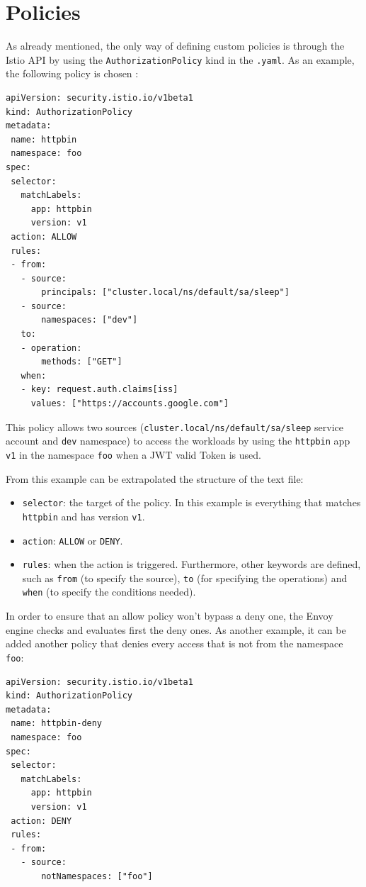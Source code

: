 \section{Policies}
As already mentioned, the only way of defining custom policies is through the Istio API by using the \texttt{AuthorizationPolicy} kind in the \texttt{.yaml}. As an example, the following policy is chosen \cite{authzpolicy}:

\begin{lstlisting}
apiVersion: security.istio.io/v1beta1
kind: AuthorizationPolicy
metadata:
 name: httpbin
 namespace: foo
spec:
 selector:
   matchLabels:
     app: httpbin
     version: v1
 action: ALLOW
 rules:
 - from:
   - source:
       principals: ["cluster.local/ns/default/sa/sleep"]
   - source:
       namespaces: ["dev"]
   to:
   - operation:
       methods: ["GET"]
   when:
   - key: request.auth.claims[iss]
     values: ["https://accounts.google.com"]
\end{lstlisting}

\noindent This policy allows two sources (\texttt{cluster.local/ns/default/sa/sleep} service account and \texttt{dev} namespace) to access the workloads by using the \texttt{httpbin} app \texttt{v1} in the namespace \texttt{foo} when a JWT valid Token is used.

\noindent From this example can be extrapolated the structure of the text file:

\begin{itemize}
 \item \texttt{selector}: the target of the policy. In this example is everything that matches \texttt{httpbin} and has version \texttt{v1}.
 \item \texttt{action}: \texttt{ALLOW} or \texttt{DENY}.
 \item \texttt{rules}: when the action is triggered. Furthermore, other keywords are defined, such as \texttt{from} (to specify the source), \texttt{to} (for specifying the operations) and \texttt{when} (to specify the conditions needed).
\end{itemize}

In order to ensure that an allow policy won't bypass a deny one, the Envoy engine checks and evaluates first the deny ones. As another example, it can be added another policy that denies every access that is not from the namespace \texttt{foo}:

\begin{lstlisting}
apiVersion: security.istio.io/v1beta1
kind: AuthorizationPolicy
metadata:
 name: httpbin-deny
 namespace: foo
spec:
 selector:
   matchLabels:
     app: httpbin
     version: v1
 action: DENY
 rules:
 - from:
   - source:
       notNamespaces: ["foo"]
\end{lstlisting}

